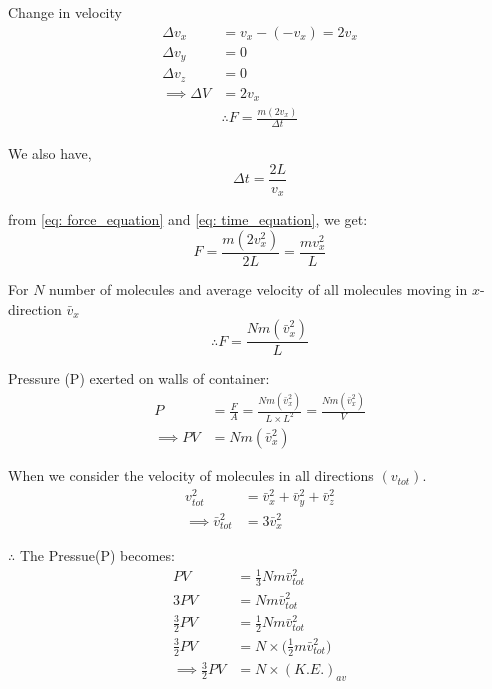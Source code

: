 \documentclass[fleqn,10pt]{SelfArx} %
\begin{document}
Change in velocity 
\begin{align}
   \Delta v_x &= v_x - (-v_x) = 2v_x \\
   \Delta v_y &= 0 \\
   \Delta v_z &= 0 \\
   \implies \Delta V &= 2v_x
   \label{eq:velocity of particle}
\end{align}
\begin{align}
    \therefore F = \frac{m (2v_x)}{\Delta t}     \label{eq: force_equation}
\end{align}

We also have,
\begin{equation}
    \Delta t = \frac{2L}{v_x}
    \label{eq: time_equation}
\end{equation}

from \cref{eq: force_equation} and \cref{eq: time_equation}, we get:
\begin{equation}
    F = \frac{m (2v_x^2)}{2L} = \frac{m v_x^2}{L}
\end{equation}

For $N$ number of molecules and average velocity of all molecules moving in $x$-direction $\bar{v}_x$
\begin{equation}
    \therefore F = \frac{Nm (\bar{v}_x^2)}{L}
\end{equation}

Pressure (P) exerted on walls of container:
\begin{align}
    P &= \frac{F}{A} = \frac{Nm (\bar{v}_x^2)}{L \times L^2} = \frac{Nm (\bar{v}_x^2)}{V} \\
    \implies  PV &=  Nm (\bar{v}_x^2)
\end{align}

When we consider  the velocity of molecules in all directions $(v_{tot})$.
\begin{align}
    v_{tot}^2 &= \bar{v}_x^2 + \bar{v}_y^2 + \bar{v}_z^2 \\
    \implies \bar{v}_{tot}^2 &= 3\bar{v}_x^2
\end{align}

$\therefore$ The Pressue(P) becomes:
\begin{align}
    PV &= \frac{1}{3} Nm \bar{v}_{tot}^2 \\
    3PV &= Nm \bar{v}_{tot}^2 \\
    \frac{3}{2} PV &= \frac{1}{2} Nm \bar{v}_{tot}^2 \\
    \frac{3}{2} PV &= N \times \Big(\frac{1}{2}m\bar{v}_{tot}^2 \Big)\\ 
    \implies \frac{3}{2} PV &= N \times(K.E.)_{av}\\ 
\end{align}
\end{document}
